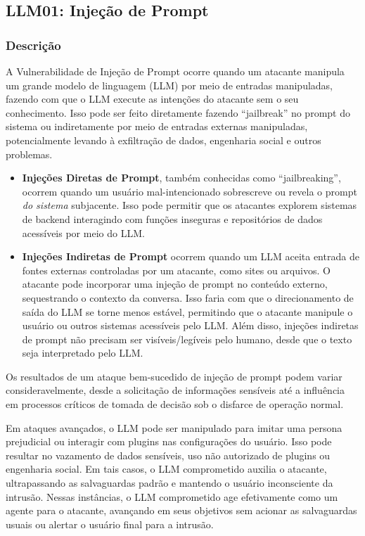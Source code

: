 \documentclass[
]{article}
\author{}
\date{}
\providecommand{\tightlist}{%
  \setlength{\itemsep}{0pt}\setlength{\parskip}{0pt}}
\begin{document}
\subsection{LLM01: Injeção de
Prompt}\label{llm01-injeuxe7uxe3o-de-prompt}

\subsubsection{Descrição}\label{descriuxe7uxe3o}

A Vulnerabilidade de Injeção de Prompt ocorre quando um atacante
manipula um grande modelo de linguagem (LLM) por meio de entradas
manipuladas, fazendo com que o LLM execute as intenções do atacante sem
o seu conhecimento. Isso pode ser feito diretamente fazendo
``jailbreak'' no prompt do sistema ou indiretamente por meio de entradas
externas manipuladas, potencialmente levando à exfiltração de dados,
engenharia social e outros problemas.

\begin{itemize}
\tightlist
\item
  \textbf{Injeções Diretas de Prompt}, também conhecidas como
  ``jailbreaking'', ocorrem quando um usuário mal-intencionado
  sobrescreve ou revela o prompt \emph{do sistema} subjacente. Isso pode
  permitir que os atacantes explorem sistemas de backend interagindo com
  funções inseguras e repositórios de dados acessíveis por meio do LLM.
\item
  \textbf{Injeções Indiretas de Prompt} ocorrem quando um LLM aceita
  entrada de fontes externas controladas por um atacante, como sites ou
  arquivos. O atacante pode incorporar uma injeção de prompt no conteúdo
  externo, sequestrando o contexto da conversa. Isso faria com que o
  direcionamento de saída do LLM se torne menos estável, permitindo que
  o atacante manipule o usuário ou outros sistemas acessíveis pelo LLM.
  Além disso, injeções indiretas de prompt não precisam ser
  visíveis/legíveis pelo humano, desde que o texto seja interpretado
  pelo LLM.
\end{itemize}

Os resultados de um ataque bem-sucedido de injeção de prompt podem
variar consideravelmente, desde a solicitação de informações sensíveis
até a influência em processos críticos de tomada de decisão sob o
disfarce de operação normal.

Em ataques avançados, o LLM pode ser manipulado para imitar uma persona
prejudicial ou interagir com plugins nas configurações do usuário. Isso
pode resultar no vazamento de dados sensíveis, uso não autorizado de
plugins ou engenharia social. Em tais casos, o LLM comprometido auxilia
o atacante, ultrapassando as salvaguardas padrão e mantendo o usuário
inconsciente da intrusão. Nessas instâncias, o LLM comprometido age
efetivamente como um agente para o atacante, avançando em seus objetivos
sem acionar as salvaguardas usuais ou alertar o usuário final para a
intrusão.
\end{document}
